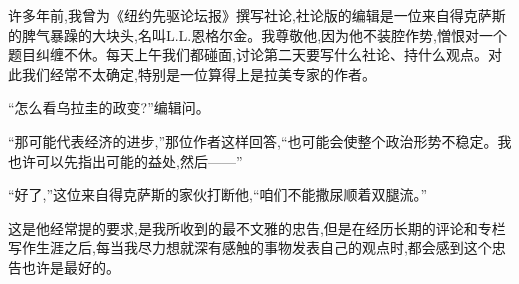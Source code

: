 许多年前,我曾为《纽约先驱论坛报》撰写社论,社论版的编辑是一位来自得克萨斯的脾气暴躁的大块头,名叫L.L.恩格尔金。我尊敬他,因为他不装腔作势,憎恨对一个题目纠缠不休。每天上午我们都碰面,讨论第二天要写什么社论、持什么观点。对此我们经常不太确定,特别是一位算得上是拉美专家的作者。

“怎么看乌拉圭的政变?”编辑问。

“那可能代表经济的进步,”那位作者这样回答,“也可能会使整个政治形势不稳定。我也许可以先指出可能的益处,然后——”

“好了,”这位来自得克萨斯的家伙打断他,“咱们不能撒尿顺着双腿流。”

这是他经常提的要求,是我所收到的最不文雅的忠告,但是在经历长期的评论和专栏写作生涯之后,每当我尽力想就深有感触的事物发表自己的观点时,都会感到这个忠告也许是最好的。